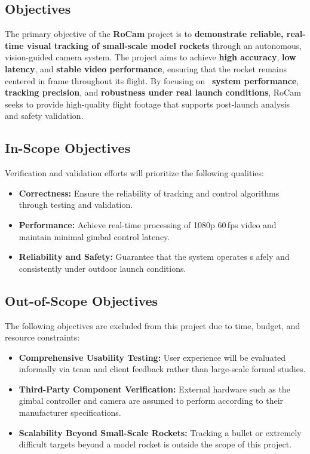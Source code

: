 \documentclass[12pt, titlepage]{article}
\begin{document}

\subsection{Objectives}
The primary objective of the \textbf{RoCam} project is to \textbf{demonstrate reliable,
 real-time visual tracking of small-scale model rockets} through an autonomous, 
 vision-guided camera system. The project aims to achieve \textbf{high accuracy}, 
 \textbf{low latency}, and \textbf{stable video performance}, ensuring that the rocket 
 remains centered in frame throughout its flight. By focusing on \
\textbf{system performance}, \textbf{tracking precision}, and \textbf{robustness under
real launch conditions}, RoCam seeks to provide high-quality flight footage that
supports post-launch analysis and safety validation.

\subsection{In-Scope Objectives}
Verification and validation efforts will prioritize the following qualities:
\begin{itemize}
    \item \textbf{Correctness:} Ensure the reliability of tracking and control 
    algorithms through testing and validation.
    \item \textbf{Performance:} Achieve real-time processing of 1080p 60\,fps 
    video and maintain minimal gimbal control latency.
    \item \textbf{Reliability and Safety:} Guarantee that the system operates s
    afely and consistently under outdoor launch conditions.
\end{itemize}

\subsection{Out-of-Scope Objectives}
The following objectives are excluded from this project due to time, budget,
 and resource constraints:
\begin{itemize}
    \item \textbf{Comprehensive Usability Testing:} User experience will be evaluated
     informally via team and client feedback rather than large-scale formal studies.
    \item \textbf{Third-Party Component Verification:} External hardware such as the 
    gimbal controller and camera are assumed to perform according to their
     manufacturer specifications.
    \item \textbf{Scalability Beyond Small-Scale Rockets:} Tracking a 
    bullet or extremely difficult
    targets beyond a model rocket is outside the scope of this project.
\end{itemize}
\end{document}
